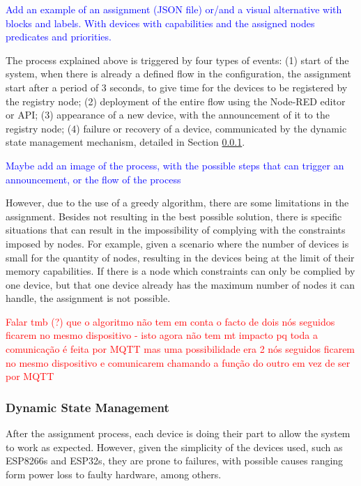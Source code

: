 \textcolor{blue}{Add an example of an assignment (JSON file) or/and a visual alternative with blocks and labels. With devices with capabilities and the assigned nodes predicates and priorities.}

The process explained above is triggered by four types of events: (1) start of the system, when there is already a defined flow in the configuration, the assignment start after a period of 3 seconds, to give time for the devices to be registered by the registry node; (2) deployment of the entire flow using the Node-RED editor or API; (3) appearance of a new device, with the announcement of it to the registry node; (4) failure or recovery of a device, communicated by the dynamic state management mechanism, detailed in Section \ref{sec:dynamic_state_management}.

\textcolor{blue}{Maybe add an image of the process, with the possible steps that can trigger an announcement, or the flow of the process}

However, due to the use of a greedy algorithm, there are some limitations in the assignment. Besides not resulting in the best possible solution, there is specific situations that can result in the impossibility of complying with the constraints imposed by nodes. For example, given a scenario where the number of devices is small for the quantity of nodes, resulting in the devices being at the limit of their memory capabilities. If there is a node which constraints can only be complied by one device, but that one device already has the maximum number of nodes it can handle, the assignment is not possible.

\textcolor{red}{Falar tmb (?) que o algoritmo não tem em conta o facto de dois nós seguidos ficarem no mesmo dispositivo - isto agora não tem mt impacto pq toda a comunicação é feita por MQTT mas uma possibilidade era 2 nós seguidos ficarem no mesmo dispositivo e comunicarem chamando a função do outro em vez de ser por MQTT}

\subsubsection{Dynamic State Management}\label{sec:dynamic_state_management}

After the assignment process, each device is doing their part to allow the system to work as expected. However, given the simplicity of the devices used, such as ESP8266s and ESP32s, they are prone to failures, with possible causes ranging form power loss to faulty hardware, among others.

